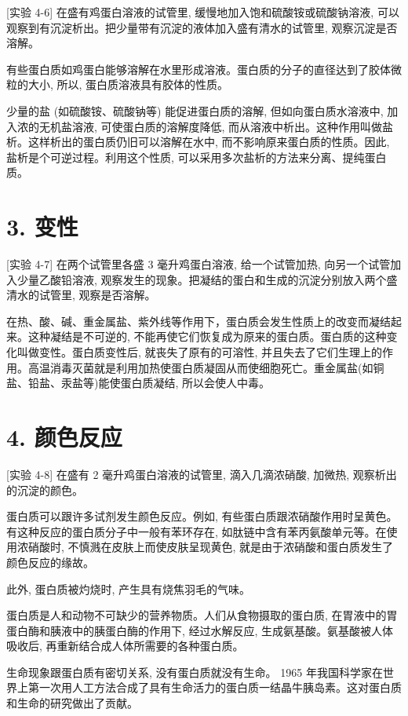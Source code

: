\documentclass[10pt]{article}
\begin{document}
[实验 4-6] 在盛有鸡蛋白溶液的试管里, 缓慢地加入饱和硫酸铵或硫酸钠溶液, 可以观察到有沉淀析出。把少量带有沉淀的液体加入盛有清水的试管里, 观察沉淀是否溶解。

有些蛋白质如鸡蛋白能够溶解在水里形成溶液。蛋白质的分子的直径达到了胶体微粒的大小, 所以, 蛋白质溶液具有胶体的性质。

少量的盐 (如硫酸铵、硫酸钠等) 能促进蛋白质的溶解, 但如向蛋白质水溶液中, 加入浓的无机盐溶液, 可使蛋白质的溶解度降低, 而从溶液中析出。这种作用叫做盐析。这样析出的蛋白质仍旧可以溶解在水中, 而不影响原来蛋白质的性质。因此, 盐析是个可逆过程。利用这个性质, 可以采用多次盐析的方法来分离、提纯蛋白质。

\section*{3. 变性}

[实验 4-7] 在两个试管里各盛 3 毫升鸡蛋白溶液, 给一个试管加热, 向另一个试管加入少量乙酸铅溶液, 观察发生的现象。把凝结的蛋白和生成的沉淀分别放入两个盛清水的试管里, 观察是否溶解。

在热、酸、碱、重金属盐、紫外线等作用下，蛋白质会发生性质上的改变而凝结起来。这种凝结是不可逆的, 不能再使它们恢复成为原来的蛋白质。蛋白质的这种变化叫做变性。蛋白质变性后, 就丧失了原有的可溶性, 并且失去了它们生理上的作用。高温消毒灭菌就是利用加热使蛋白质凝固从而使细胞死亡。重金属盐(如铜盐、铅盐、汞盐等)能使蛋白质凝结, 所以会使人中毒。

\section*{4. 颜色反应}

[实验 4-8] 在盛有 2 毫升鸡蛋白溶液的试管里, 滴入几滴浓硝酸, 加微热, 观察析出的沉淀的颜色。

蛋白质可以跟许多试剂发生颜色反应。例如, 有些蛋白质跟浓硝酸作用时呈黄色。有这种反应的蛋白质分子中一般有苯环存在, 如肽链中含有苯丙氨酸单元等。在使用浓硝酸时, 不慎溅在皮肤上而使皮肤呈现黄色, 就是由于浓硝酸和蛋白质发生了颜色反应的缘故。

此外, 蛋白质被灼烧时, 产生具有烧焦羽毛的气味。

蛋白质是人和动物不可缺少的营养物质。人们从食物摄取的蛋白质, 在胃液中的胃蛋白酶和胰液中的胰蛋白酶的作用下, 经过水解反应, 生成氨基酸。氨基酸被人体吸收后, 再重新结合成人体所需要的各种蛋白质。

生命现象跟蛋白质有密切关系, 没有蛋白质就没有生命。 1965 年我国科学家在世界上第一次用人工方法合成了具有生命活力的蛋白质一结晶牛胰岛素。这对蛋白质和生命的研究做出了贡献。
\end{document}
